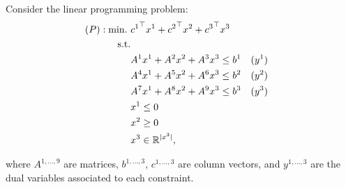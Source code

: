\noindent Consider the linear programming problem:
\begin{align*}
	(P) : \mathop{\text{min.~}} &  {c^1}^\top x^1 + {c^2}^\top x^2 + {c^3}^\top x^3 & \\
	\text{s.t.} & \\ 
	 & {A}^1{x}^1 + {A}^2{x}^2 + {A}^3{x}^3 \leq b^1 \quad (y^1) \\
	 & {A}^4{x}^1 + {A}^5{x}^2 + {A}^6{x}^3 \leq b^2 \quad (y^2) \\	 
	 & {A}^7{x}^1 + {A}^8{x}^2 + {A}^9{x}^3 \leq b^3 \quad (y^3) \\
	 & x^1 \leq 0 \\
	 & x^2 \geq 0 \\
	 & x^3  \in \mathbb{R}^{|x^3|},
\end{align*}

\noindent where $A^{1,...,9}$ are matrices, $b^{1,...,3}$, $c^{1,...,3}$ are column vectors, and $y^{1,...,3}$ are the dual variables associated to each constraint. 

